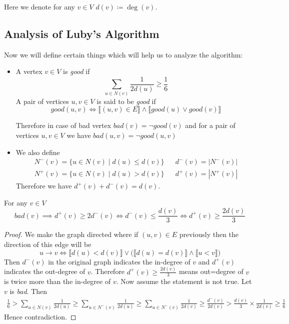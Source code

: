 Here we denote for any $v\in V$ $d(v)\coloneqq \deg(v)$. 






\subsection{Analysis of Luby's Algorithm}
Now we will define certain things which will help us to analyze the algorithm: 
\begin{itemize}
	\item A vertex $ v\in V$ is \textit{good} if $$\sum_{u\in N(v)}\frac{1}{2d(u)}\geq \frac16$$A pair of vertices $u,v\in V$ is said to be \textit{good} if $$good(u,v)\iff \llbracket(u,v)\in E\rrbracket\wedge\llbracket good(u)\vee good(v)\rrbracket$$
	
	Therefore in case of bad vertex $bad(v)=\neg good(v)$ and for a pair of vertices $u,v\in V$ we have $bad(u,v)=\neg good(u,v)$
	\item We also define \begin{align*}
		N^-(v)=\{u\in N(v)\mid d(u)\leq d(v)\} && d^-(v)=|N^-(v)|\\
		N^+(v)=\{u\in N(v)\mid d(u)>d(v)\} && d^+(v)=|N^+(v)|
	\end{align*}
Therefore we have $d^+(v)+d^-(v)=d(v)$.
\end{itemize}


\begin{lemma}\label{badv}
	For any $v\in V$	$$bad(v)\implies d^+(v)\geq 2d^-(v)\iff  d^-(v)\leq \frac{d(v)}{3}\iff d^+(v)\geq \frac{2d(v)}{3}$$
\end{lemma}
\begin{proof}
	We make the graph directed where if $(u,v)\in E$ previously then the direction of this edge will be $$u\to v\iff \llbracket d(u)<d(v)\rrbracket \vee \Big(\llbracket d(u)=d(v)\rrbracket\wedge \llbracket u<v\rrbracket\Big)$$ Then $d^-(v)$ in the original graph indicates the in-degree of $v$ and $d^+(v)$ indicates the out-degree of $v$. Therefore $d^+(v)\geq \frac{2d(v)}{3}$ means out=degree of $v$ is twice more than the in-degree of $v$. Now assume the statement is not true. Let $v$ is \textit{bad}. Then\begin{align*}
		\frac16 > \sum_{u\in N(v)}\frac{1}{2d(u)}\geq \sum_{u\in N^-(v)}\frac1{2d(u)}\geq \sum_{u\in N^-(v)}\frac1{2d(v)}\geq \frac{d^{-}(v)}{2d(v)}>\frac{d(v)}3\times \frac{1}{2d(v)}\geq \frac16
	\end{align*}Hence contradiction.
\end{proof}

